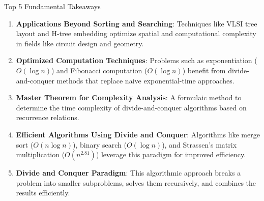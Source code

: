 \documentclass{beamer}
\begin{document}
\begin{frame}{Top 5 Fundamental Takeaways}
    \footnotesize
    \begin{enumerate} \pause
        \item[5] \textbf{Applications Beyond Sorting and Searching}: Techniques like VLSI tree layout and H-tree embedding optimize spatial and computational complexity in fields like circuit design and geometry. \pause

        \item[4] \textbf{Optimized Computation Techniques}: Problems such as exponentiation ($O(\log n)$) and Fibonacci computation ($O(\log n)$) benefit from divide-and-conquer methods that replace naive exponential-time approaches. \pause

        \item[3] \textbf{Master Theorem for Complexity Analysis}: A formulaic method to determine the time complexity of divide-and-conquer algorithms based on recurrence relations. \pause

        \item[2] \textbf{Efficient Algorithms Using Divide and Conquer}: Algorithms like merge sort ($O(n \log n)$), binary search ($O(\log n)$), and Strassen’s matrix multiplication ($O(n^{2.81})$) leverage this paradigm for improved efficiency. \pause

        \item[1] \textbf{Divide and Conquer Paradigm}: This algorithmic approach breaks a problem into smaller subproblems, solves them recursively, and combines the results efficiently. \pause

    \end{enumerate}
\end{frame}
\end{document}
